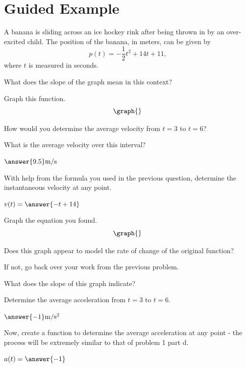 \documentclass{ximera}
\begin{document}
\section{Guided Example}
\begin{question}
A banana is sliding across an ice hockey rink after being thrown in by an over-excited child. The position of the banana, in meters, can be given by $$p(t) = -\dfrac{1}{2}t^2+14t+11\text{,}$$ where $t$ is measured in seconds.

What does the slope of the graph mean in this context?
\begin{multipleChoice}
\end{multipleChoice}

Graph this function.
\[
    \graph{}
\]

How would you determine the average velocity from $t = 3$ to $t = 6$?

\begin{multipleChoice}
\end{multipleChoice}


What is the average velocity over this interval?

$\answer{9.5}\text{m} / \text{s}$

With help from the formula you used in the previous question, determine the instantaneous velocity at any point.

$v(t) =  \answer{-t+14}$


Graph the equation you found.
\[
    \graph{}
\]

Does this graph appear to model the rate of change of the original function?

\begin{multipleChoice}
\end{multipleChoice}

If not, go back over your work from the previous problem.


What does the slope of this graph indicate?

\begin{multipleChoice}
\end{multipleChoice}

Determine the average acceleration from $t = 3$ to $t = 6$.

$\answer{-1} \text{m}/\text{s}^2$

Now, create a function to determine the average acceleration at any point - the process will be extremely similar to that of problem 1 part d.

$a(t) = \answer{-1}$
\end{question}
\end{document}
